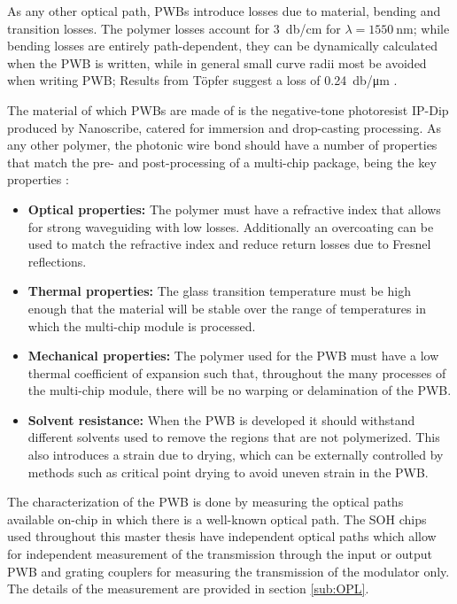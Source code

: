 As any other optical path, PWBs introduce losses due to material, bending and transition losses. The polymer losses account for \SI{3}{\decibel / \centi\meter} for $\lambda=\SI{1550}{\nano\meter}$; while bending losses are entirely path-dependent, they can be dynamically calculated when the PWB is written, while in general small curve radii most be avoided when writing PWB; Results from T{ö}pfer suggest a loss of \SI{0.24}{\decibel/\micro\meter} \cite{ToepferPWB14}. 

The material of which PWBs are made of is the negative-tone photoresist IP-Dip produced by Nanoscribe, catered for immersion and drop-casting processing. As any other polymer, the photonic wire bond should have a number of properties that match the pre- and post-processing of a multi-chip package, being the key properties \cite{PolyWong13}:

\begin{itemize}
\item \textbf{Optical properties:} The polymer must have a refractive index that allows for strong waveguiding with low losses. Additionally an overcoating can be used to match the refractive index and reduce return losses due to Fresnel reflections.
\item \textbf{Thermal properties:} The glass transition temperature must be high enough that the material will be stable over the range of temperatures in which the multi-chip module is processed. 
\item\textbf{ Mechanical properties:} The polymer used for the PWB must have a low thermal coefficient of expansion such that, throughout the many processes of the multi-chip module, there will be no warping or delamination of the PWB.
\item \textbf{Solvent resistance:} When the PWB is developed it should withstand different solvents used to remove the regions that are not polymerized. This also introduces a strain due to drying, which can be externally controlled by methods such as critical point drying to avoid uneven strain in the PWB.
\end{itemize}

The characterization of the PWB is done by measuring the optical paths available on-chip in which there is a well-known optical path. The SOH chips used throughout this master thesis have independent optical paths which allow for independent measurement of the transmission through the input or output PWB and grating couplers for measuring the transmission of the modulator only. The details of the measurement are provided in section \ref{sub:OPL}.

